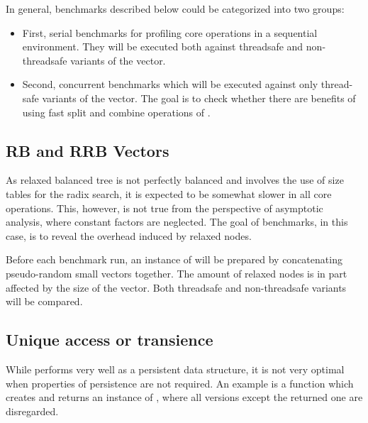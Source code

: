 
In general, benchmarks described below could be categorized into two groups:

\begin{itemize}
    \item First, serial benchmarks for profiling core operations in a sequential environment. They will be executed both against threadsafe and non-threadsafe variants of the vector. 
    \item Second, concurrent benchmarks which will be executed against only thread-safe variants of the vector. The goal is to check whether there are benefits of using fast split and combine operations of \rrbvec{}.
\end{itemize}


\subsection{RB and RRB Vectors}
As relaxed balanced tree is not perfectly balanced and involves the use of size tables for the radix search, it is expected to be somewhat slower in all core operations. This, however, is not true from the perspective of asymptotic analysis, where constant factors are neglected. The goal of benchmarks, in this case, is to reveal the overhead induced by relaxed nodes. 

Before each benchmark run, an instance of \rrbvec{} will be prepared by concatenating pseudo-random small vectors together. The amount of relaxed nodes is in part affected by the size of the vector. Both threadsafe and non-threadsafe variants will be compared. 


\subsection{Unique access or transience}
While \rrbvec{} performs very well as a persistent data structure, it is not very optimal when properties of persistence are not required. An example is a function which creates and returns an instance of \rrbvec{}, where all versions except the returned one are disregarded.

